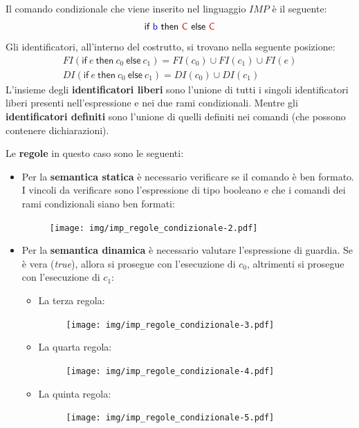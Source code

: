 \documentclass[a4paper]{article}
\begin{document}
 	Il comando condizionale che viene inserito nel linguaggio $IMP$ è il seguente:
 	\begin{equation*}
 		\textsf{if \textcolor{Blue3}{b} then \textcolor{Red3}{C} else \textcolor{Red3}{C}}
 	\end{equation*}
 	Gli identificatori, all'interno del costrutto, si trovano nella seguente posizione:
 	\begin{gather*}
 		FI\left(\mathsf{if} \: e \: \mathsf{then} \: c_{0} \: \mathsf{else} \: c_{1}\right) = FI\left(c_{0}\right) \cup FI\left(c_{1}\right) \cup FI\left(e\right) \\
 		DI\left(\mathsf{if} \: e \: \mathsf{then} \: c_{0} \: \mathsf{else} \: c_{1}\right) = DI\left(c_{0}\right) \cup DI\left(c_{1}\right)
 	\end{gather*}
 	L'insieme degli \textbf{identificatori liberi} sono l'unione di tutti i singoli identificatori liberi presenti nell'espressione e nei due rami condizionali. Mentre gli \textbf{identificatori definiti} sono l'unione di quelli definiti nei comandi (che possono contenere dichiarazioni).\newline
 	
 	\noindent
 	Le \textbf{regole} in questo caso sono le seguenti:
 	\begin{itemize}
 		\item Per la \textbf{semantica statica} è necessario verificare se il comando è ben formato. I vincoli da verificare sono l'espressione di tipo booleano e che i comandi dei rami condizionali siano ben formati:
 		\begin{figure}[!htp]
 			\centering
 			\texttt{[image: img/imp\_regole\_condizionale-2.pdf]}
 		\end{figure}
 		
 		\item Per la \textbf{semantica dinamica} è necessario valutare l'espressione di guardia. Se è vera (\emph{true}), allora si prosegue con l'esecuzione di $c_{0}$, altrimenti si prosegue con l'esecuzione di $c_{1}$:
 		\begin{itemize}
 			\item La terza regola:
 			\begin{figure}[!htp]
 				\centering
 				\texttt{[image: img/imp\_regole\_condizionale-3.pdf]}
 			\end{figure}
 			
 			\item La quarta regola:
 			\begin{figure}[!htp]
 				\centering
 				\texttt{[image: img/imp\_regole\_condizionale-4.pdf]}
 			\end{figure}
 			
 			\item La quinta regola:
 			\begin{figure}[!htp]
 				\centering
 				\texttt{[image: img/imp\_regole\_condizionale-5.pdf]}
 			\end{figure}
 		\end{itemize}
 	\end{itemize}\newpage
 	
\end{document}
